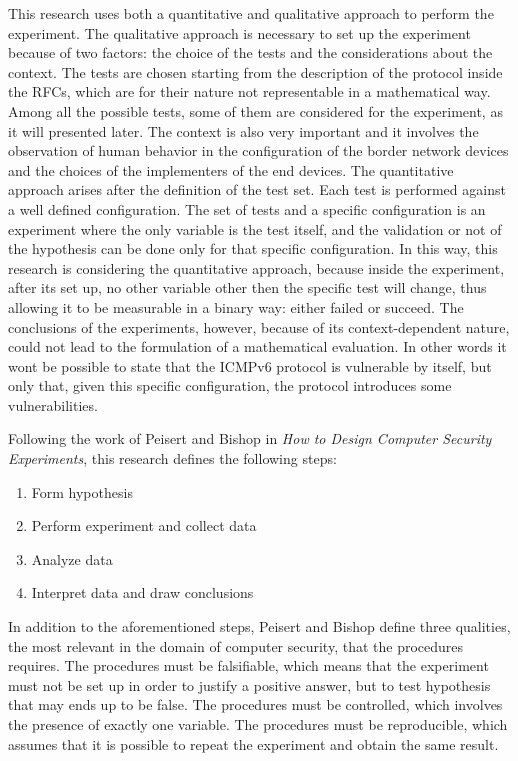 \documentclass[12pt]{article}
\begin{document}
This research uses both a quantitative and qualitative approach to perform the experiment. The qualitative approach is necessary to set up the experiment because of two factors: the choice of the tests and the considerations about the context. The tests are chosen starting from the description of the protocol inside the RFCs, which are for their nature not representable in a mathematical way. Among all the possible tests, some of them are considered for the experiment, as it will presented later. The context is also very important and it involves the observation of human behavior in the configuration of the border network devices and the choices of the implementers of the end devices. The quantitative approach arises after the definition of the test set. Each test is performed against a well defined configuration. The set of tests and a specific configuration is an experiment where the only variable is the test itself, and the validation or not of the hypothesis can be done only for that specific configuration. In this way, this research is considering the quantitative approach, because inside the experiment, after its set up, no other variable other then the specific test will change, thus allowing it to be measurable in a binary way: either failed or succeed. The conclusions of the experiments, however, because of its context-dependent nature, could not lead to the formulation of a mathematical evaluation. In other words it wont be possible to state that the ICMPv6 protocol is vulnerable by itself, but only that, given this specific configuration, the protocol introduces some vulnerabilities.

Following the work of Peisert and Bishop in \textit{How to Design Computer Security Experiments}, this research defines the following steps:
\vspace{-10pt}
\begin{enumerate}[noitemsep,topsep=0pt,partopsep=0pt]
 \item Form hypothesis
 \item Perform experiment and collect data
 \item Analyze data
 \item Interpret data and draw conclusions
\end{enumerate}

In addition to the aforementioned steps, Peisert and Bishop define three qualities, the most relevant in the domain of computer security, that the procedures requires. The procedures must be falsifiable, which means that the experiment must not be set up in order to justify a positive answer, but to test hypothesis that may ends up to be false. The procedures must be controlled, which involves the presence of exactly one variable. The procedures must be reproducible, which assumes that it is possible to repeat the experiment and obtain the same result.\cite{secExperiments}
\end{document}
